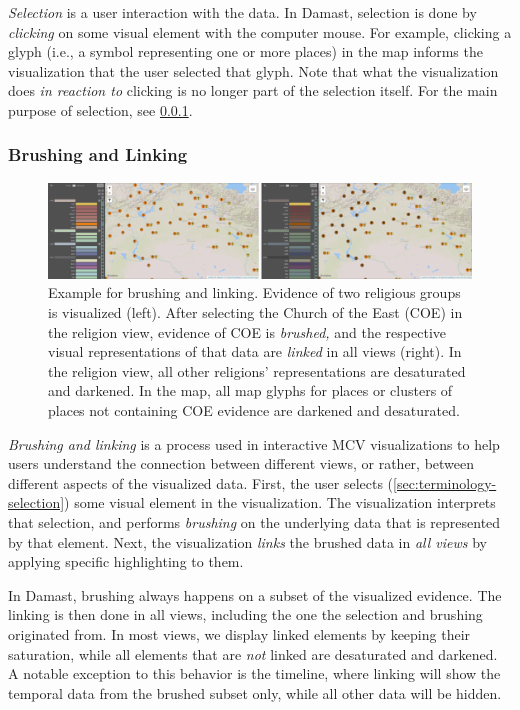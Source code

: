 \emph{Selection} is a user interaction with the data.
In Damast, selection is done by \emph{clicking} on some visual element with the computer mouse.
For example, clicking a glyph (i.e., a symbol representing one or more places) in the map informs the visualization that the user selected that glyph.
Note that what the visualization does \emph{in reaction to} clicking is no longer part of the selection itself.
For the main purpose of selection, see \cref{sec:terminology-brushing-linking}.

\subsubsection{Brushing and Linking}
\label{sec:terminology-brushing-linking}

\begin{figure}[tb]
  \centering
  \includegraphics[width=\textwidth]{../src/assets/visualization-documentation/brushing-linking-horizontal.png}
  \caption{
    Example for brushing and linking.
    Evidence of two religious groups is visualized (left).
    After selecting the Church of the East (COE) in the religion view, evidence of COE is \emph{brushed,} and the respective visual representations of that data are \emph{linked} in all views (right).
    In the religion view, all other religions' representations are desaturated and darkened.
    In the map, all map glyphs for places or clusters of places not containing COE evidence are darkened and desaturated.
  }
  \label{fig:brushing-linking}
\end{figure}


\emph{Brushing and linking} is a process used in interactive MCV visualizations to help users understand the connection between different views, or rather, between different aspects of the visualized data.
First, the user selects (\cref{sec:terminology-selection}) some visual element in the visualization.
The visualization interprets that selection, and performs \emph{brushing} on the underlying data that is represented by that element.
Next, the visualization \emph{links} the brushed data in \emph{all views} by applying specific highlighting to them.

In Damast, brushing always happens on a subset of the visualized evidence.
The linking is then done in all views, including the one the selection and brushing originated from.
In most views, we display linked elements by keeping their saturation, while all elements that are \emph{not} linked are desaturated and darkened.
A notable exception to this behavior is the timeline, where linking will show the temporal data from the brushed subset only, while all other data will be hidden.

